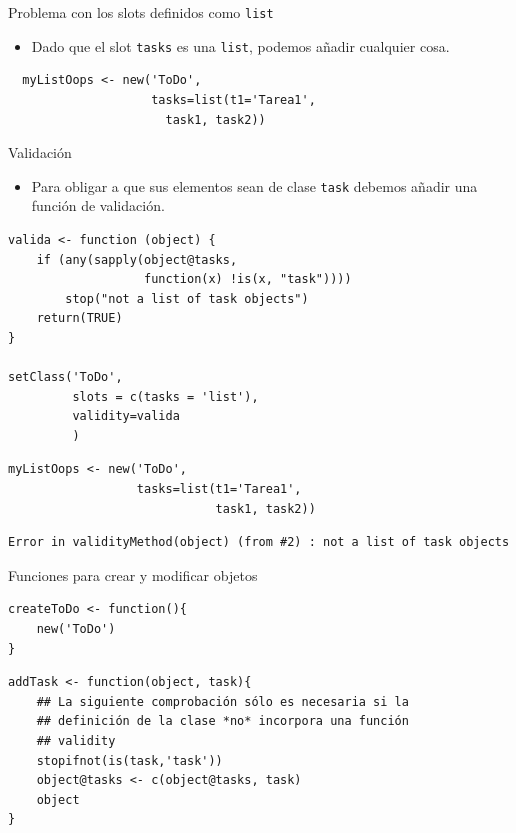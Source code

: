 \documentclass[xcolor={usenames,svgnames,dvipsnames}]{beamer}
\begin{document}
\begin{frame}[fragile,label={sec:orgheadline28}]{Problema con los slots definidos como \texttt{list}}
 \begin{itemize}
\item Dado que el slot \texttt{tasks} es una \texttt{list}, podemos añadir cualquier
cosa.
\end{itemize}
\lstset{language=R,label= ,caption= ,captionpos=b,numbers=none}
\begin{lstlisting}
  myListOops <- new('ToDo',
                    tasks=list(t1='Tarea1',
                      task1, task2))
\end{lstlisting}
\end{frame}

\begin{frame}[fragile,label={sec:orgheadline29}]{Validación}
 \begin{itemize}
\item Para obligar a que sus elementos sean de clase \texttt{task} debemos añadir
una función de validación.
\end{itemize}
\lstset{language=R,label= ,caption= ,captionpos=b,numbers=none}
\begin{lstlisting}
valida <- function (object) {
    if (any(sapply(object@tasks,
                   function(x) !is(x, "task")))) 
        stop("not a list of task objects")
    return(TRUE)
}

setClass('ToDo',
         slots = c(tasks = 'list'),
         validity=valida
         )
\end{lstlisting}

\lstset{language=R,label= ,caption= ,captionpos=b,numbers=none}
\begin{lstlisting}
myListOops <- new('ToDo',
                  tasks=list(t1='Tarea1',
                             task1, task2))
\end{lstlisting}

\begin{verbatim}
Error in validityMethod(object) (from #2) : not a list of task objects
\end{verbatim}
\end{frame}

\begin{frame}[fragile,label={sec:orgheadline30}]{Funciones para crear y modificar objetos}
 \lstset{language=R,label= ,caption= ,captionpos=b,numbers=none}
\begin{lstlisting}
createToDo <- function(){
    new('ToDo')
}
\end{lstlisting}

\lstset{language=R,label= ,caption= ,captionpos=b,numbers=none}
\begin{lstlisting}
addTask <- function(object, task){
    ## La siguiente comprobación sólo es necesaria si la
    ## definición de la clase *no* incorpora una función 
    ## validity
    stopifnot(is(task,'task'))
    object@tasks <- c(object@tasks, task)
    object
}
\end{lstlisting}
\end{frame}
\end{document}
